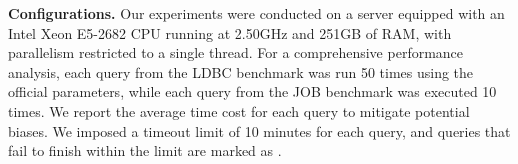 
\noindent\textbf{Configurations. }
Our experiments were conducted on a server equipped with an Intel Xeon E5-2682 CPU running at 2.50GHz and 251GB of RAM, with parallelism restricted to a single thread.
For a comprehensive performance analysis, each query from the LDBC benchmark was run 50 times using the official parameters, while each query from the JOB benchmark was executed 10 times. We report the average time cost for each query to mitigate potential biases.
We imposed a timeout limit of 10 minutes for each query, and queries that fail to finish within the limit are marked as \ot.

